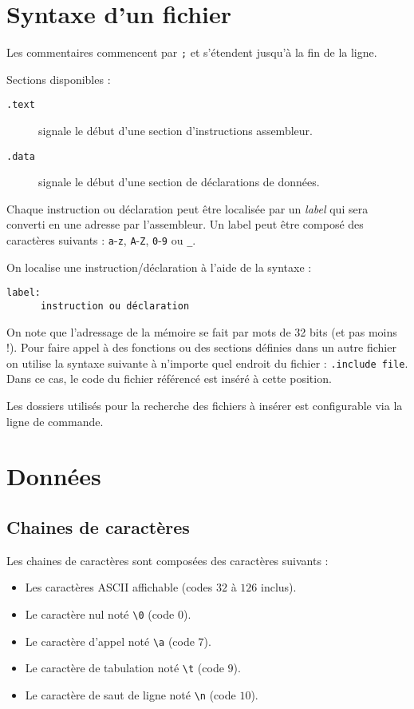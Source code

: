 \documentclass[french, 12pt]{article}
\begin{document}
\section*{Syntaxe d'un fichier}
Les commentaires commencent par \texttt{;} et s'étendent jusqu'à la fin de la ligne.

Sections disponibles  :
\begin{description}
      \item[\texttt{.text}] signale le début d'une section d'instructions assembleur.
      \item[\texttt{.data}] signale le début d'une section de déclarations de données.
\end{description}


Chaque instruction ou déclaration peut être localisée par un \emph{label} qui
sera converti en une adresse par l'assembleur. Un label peut être composé des
caractères suivants : \texttt{a}-\texttt{z}, \texttt{A}-\texttt{Z},
\texttt{0}-\texttt{9} ou \texttt{\_}.


On localise une instruction/déclaration à l'aide de la syntaxe :
\begin{verbatim}
label:
      instruction ou déclaration
\end{verbatim}


On note que l'adressage de la mémoire se fait par mots de 32 bits (et pas moins !).
Pour faire appel à des fonctions ou des sections définies dans un autre fichier
on utilise la syntaxe suivante à n'importe quel endroit du fichier :
\verb|.include file|. Dans ce cas, le code du fichier référencé est inséré
à cette position.

Les dossiers utilisés pour la recherche des fichiers à insérer est configurable
via la ligne de commande.%
%

\section*{Données}

\subsection*{Chaines de caractères}

Les chaines de caractères sont composées des caractères suivants :
\begin{itemize}
      \item Les caractères ASCII affichable (codes $32$ à $126$ inclus).
      \item Le caractère nul noté \verb|\0| (code $0$).
      \item Le caractère d'appel noté \verb|\a| (code $7$).
      \item Le caractère de tabulation noté \verb|\t| (code $9$).
      \item Le caractère de saut de ligne noté \verb|\n| (code $10$).
\end{itemize}
\end{document}
